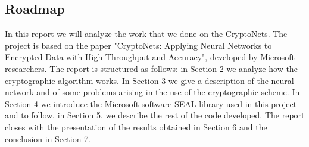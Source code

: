 \subsection{Roadmap}

In this report we will analyze the work that we done on the CryptoNets. The project is based on the paper "CryptoNets: Applying Neural Networks to Encrypted Data with High Throughput and Accuracy", developed by Microsoft researchers. The report is structured as follows: in Section 2 we analyze how the cryptographic algorithm works. In Section 3 we give a description of the neural network and of some problems arising in the use of the cryptographic scheme. In Section 4 we introduce the Microsoft software SEAL library used in this project and to follow, in Section 5, we describe the rest of the code developed. The report closes with the presentation of the results obtained in Section 6 and the conclusion in Section 7.